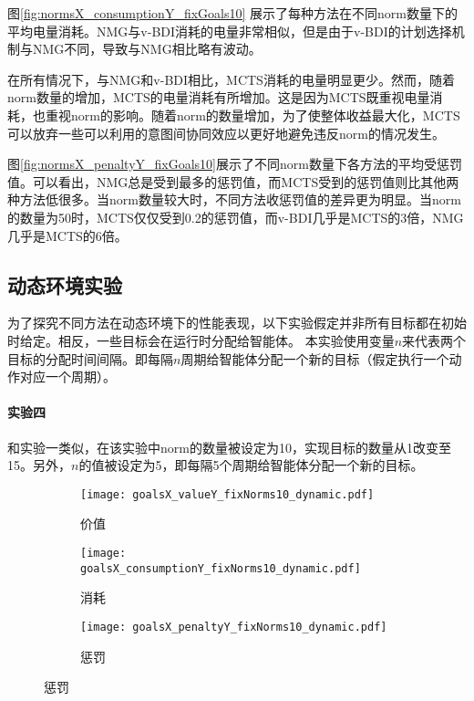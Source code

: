 图\ref{fig:normsX_consumptionY_fixGoals10} 展示了每种方法在不同norm数量下的平均电量消耗。NMG与v-BDI消耗的电量非常相似，但是由于v-BDI的计划选择机制与NMG不同，导致与NMG相比略有波动。

在所有情况下，与NMG和v-BDI相比，MCTS消耗的电量明显更少。然而，随着norm数量的增加，MCTS的电量消耗有所增加。这是因为MCTS既重视电量消耗，也重视norm的影响。随着norm的数量增加，为了使整体收益最大化，MCTS可以放弃一些可以利用的意图间协同效应以更好地避免违反norm的情况发生。

图\ref{fig:normsX_penaltyY_fixGoals10}展示了不同norm数量下各方法的平均受惩罚值。可以看出，NMG总是受到最多的惩罚值，而MCTS受到的惩罚值则比其他两种方法低很多。当norm数量较大时，不同方法收惩罚值的差异更为明显。当norm的数量为50时，MCTS仅仅受到0.2的惩罚值，而v-BDI几乎是MCTS的3倍，NMG几乎是MCTS的6倍。

\subsection{动态环境实验}
为了探究不同方法在动态环境下的性能表现，以下实验假定并非所有目标都在初始时给定。相反，一些目标会在运行时分配给智能体。
%
本实验使用变量$n$来代表两个目标的分配时间间隔。即每隔$n$周期给智能体分配一个新的目标（假定执行一个动作对应一个周期）。

\paragraph{实验四}
和实验一类似，在该实验中norm的数量被设定为10，实现目标的数量从1改变至15。另外，$n$的值被设定为5，即每隔5个周期给智能体分配一个新的目标。
\begin{figure}
\centering
\begin{subfigure}{.47\textwidth}
  \centering
  \texttt{[image: goalsX\_valueY\_fixNorms10\_dynamic.pdf]}
  \captionsetup{justification=centering}
  \caption{价值}
  \label{fig:goalsX_valueY_fixNorms10_dynamic}
\end{subfigure}

\begin{subfigure}{.47\textwidth}
  \centering
  \texttt{[image: goalsX\_consumptionY\_fixNorms10\_dynamic.pdf]}
  \captionsetup{justification=centering}
  \caption{消耗}
  \label{fig:goalsX_consumptionY_fixNorms10_dynamic}
\end{subfigure}
\begin{subfigure}{.47\textwidth}
  \centering
  \texttt{[image: goalsX\_penaltyY\_fixNorms10\_dynamic.pdf]}
  \captionsetup{justification=centering}
  \caption{惩罚}
  \label{fig:goalsX_penaltyY_fixNorms10_dynamic}
\end{subfigure}
\captionsetup{justification=centering}
\label{fig:all_fixNorms10_dynamic}
\end{figure}

